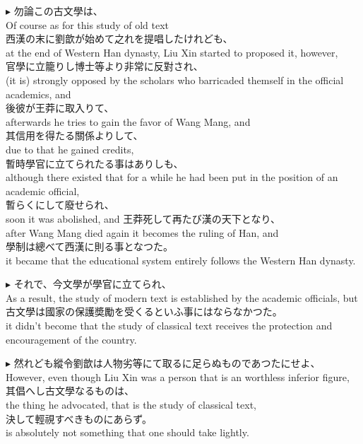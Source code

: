 \documentclass{ctexart}
\makeatletter
\newcommand*{\shifttext}[1]{%
  \settowidth{\@tempdima}{#1}%
  \hspace{-\@tempdima}#1%
}
\newcommand{\plabel}[1]{%
\shifttext{\textbf{#1}\quad}%
}
\newcommand{\prule}{%
\begin{center}%
\hdashrule[0.5ex]{.99\linewidth}{1pt}{1pt 2.5pt}%
\end{center}%
}
\makeatother
\begin{document}
\prule

\plabel{$\blacktriangleright$}%
勿論この古文學は、\\
Of course as for this study of old text\\
西漢の末に劉歆が始めて之れを提唱したけれども、\\
at the end of Western Han dynasty, Liu Xin started to proposed it, however,\\
官學に立籠りし博士等より非常に反對され、\\
(it is) strongly opposed by the scholars who barricaded themself in the official academics, and\\
後彼が王莽に取入りて、\\
afterwards he tries to gain the favor of Wang Mang, and\\
其信用を得たる關係よりして、\\
due to that he gained credits,\\
暫時學官に立てられたる事はありしも、\\
although there existed that for a while he had been put in the position of an academic official,\\
暫らくにして廢せられ、\\
soon it was abolished, and
王莽死して再たび漢の天下となり、\\
after Wang Mang died again it becomes the ruling of Han, and\\
學制は總べて西漢に則る事となつた。\\
it became that the educational system entirely follows the Western Han dynasty.

\vspace{1em}
\plabel{$\blacktriangleright$}%
それで、今文學が學官に立てられ、\\
As a result, the study of modern text is established by the academic officials, but\\
古文學は國家の保護奬勵を受くるといふ事にはならなかつた。\\
it didn't become that the study of classical text receives the protection and encouragement of the country.

\vspace{1em}
\plabel{$\blacktriangleright$}%
然れども縱令劉歆は人物劣等にて取るに足らぬものであつたにせよ、\\
However, even though Liu Xin was a person that is an worthless inferior figure,\\
其倡へし古文學なるものは、\\
the thing he advocated, that is the study of classical text,\\
決して輕視すべきものにあらず。\\
is absolutely not something that one should take lightly.
\end{document}

